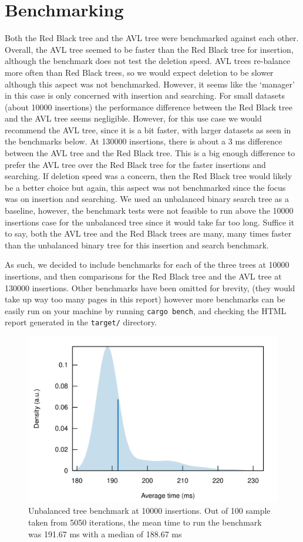 \documentclass[letterpaper]{article}
\begin{document}
\section{Benchmarking}
Both the Red Black tree and the AVL tree were benchmarked against each other.
Overall, the AVL tree seemed to be faster than the Red Black tree for insertion,
although the benchmark does not test the deletion speed. AVL trees re-balance
more often than Red Black trees, so we would expect deletion to be slower
although this aspect was not benchmarked.  However, it seems like the `manager'
in this case is only concerned with insertion and searching. For small datasets
(about 10000 insertions) the performance difference between the Red Black tree
and the AVL tree seems negligible. However, for this use case we would recommend
the AVL tree, since it is a bit faster, with larger datasets as seen in the
benchmarks below. At 130000 insertions, there is about a 3 ms difference between
the AVL tree and the Red Black tree. This is a big enough difference to prefer
the AVL tree over the Red Black tree for the faster insertions and searching.
If deletion speed was a concern, then the Red Black tree would
likely be a better choice but again, this aspect was not benchmarked since the
focus was on insertion and searching. We used an unbalanced binary search tree
as a baseline, however, the benchmark tests were not feasible to run above the
10000 insertions case for the unbalanced tree since it would take far too long.
Suffice it to say, both the AVL tree and the Red Black trees are many, many
times faster than the unbalanced binary tree for this insertion and search
benchmark.

As such, we decided to include benchmarks for each of the three trees at 10000
insertions, and then comparisons for the Red Black tree and the AVL tree at
130000 insertions. Other benchmarks have been omitted for brevity,
(they would take up way too many pages in this report)
however more benchmarks can be easily run on your machine by running
\verb|cargo bench|, and checking the HTML report generated in the
\texttt{target/} directory.


\begin{figure}[H]
      \centering
      \includegraphics[width=.8\textwidth]{bsbench.png}
      \caption{Unbalanced tree benchmark at 10000 insertions. Out of 100 sample
      taken from 5050 iterations, the mean time to run the benchmark was
    191.67 ms with a median of 188.67 ms}
\end{figure}
\end{document}
